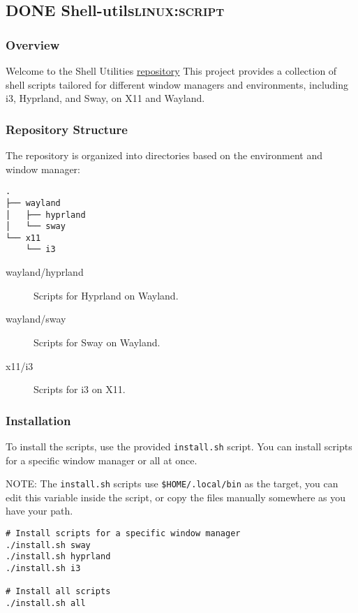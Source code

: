 \documentclass[11pt]{article}
\begin{document}
\subsection{{\bfseries\sffamily DONE} Shell-utils\hfill{}\textsc{linux:script}}
\label{sec:orgec9dddf}
\subsubsection{Overview}
\label{sec:orgb695670}
Welcome to the Shell Utilities \href{https://github.com/jpachecoxyz/shell-utils}{repository} This project provides a collection of shell scripts tailored for different window managers and environments, including i3, Hyprland, and Sway, on X11 and Wayland.
\subsubsection{Repository Structure}
\label{sec:org7d49ad1}
The repository is organized into directories based on the environment and window manager:

\begin{verbatim}
.
├── wayland
│   ├── hyprland
│   └── sway
└── x11
    └── i3
\end{verbatim}

\begin{description}
\item[{wayland/hyprland}] Scripts for Hyprland on Wayland.
\item[{wayland/sway}] Scripts for Sway on Wayland.
\item[{x11/i3}] Scripts for i3 on X11.
\end{description}
\subsubsection{Installation}
\label{sec:org18e1a40}
To install the scripts, use the provided \texttt{install.sh} script. You can install scripts for a specific window manager or all at once. 

NOTE: The \texttt{install.sh} scripts use \texttt{\$HOME/.local/bin} as the target, you can edit this variable inside the script, or copy the files manually somewhere as you have your path.

\begin{verbatim}
# Install scripts for a specific window manager
./install.sh sway
./install.sh hyprland
./install.sh i3

# Install all scripts
./install.sh all
\end{verbatim}
\end{document}
